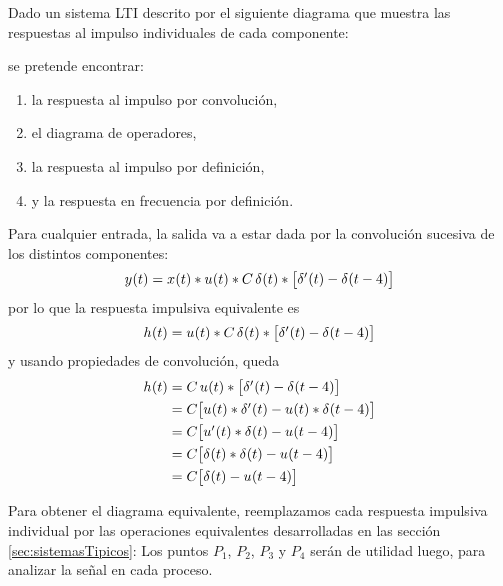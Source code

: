 \begin{mdframed}[style=ExampleFrame]
    \begin{example}
    \end{example}
    Dado un sistema LTI descrito por el siguiente diagrama que muestra las respuestas al impulso individuales de cada componente:

    \begin{center}
        \def\svgwidth{\linewidth}
        
    \end{center}

    se pretende encontrar:

    \begin{enumerate}
        \item la respuesta al impulso por convolución,
        \item el diagrama de operadores,
        \item la respuesta al impulso por definición,
        \item y la respuesta en frecuencia por definición.
    \end{enumerate}


    Para cualquier entrada, la salida va a estar dada por la convolución sucesiva de los distintos componentes:
    \[
        \fx[y]{t} = \fx[x]{t} * \fx[u]{t} * C \, \fx[\delta]{t} * \inBrackets{\fx[\delta']{t} - \fx[\delta]{t-4}}
    \]
    por lo que la respuesta impulsiva equivalente es
    \[
        \fx[h]{t} = \fx[u]{t} * C \, \fx[\delta]{t} * \inBrackets{\fx[\delta']{t} - \fx[\delta]{t-4}}
    \]
    y usando propiedades de convolución, queda
    \begin{align*}
        \fx[h]{t}
        & = C \, \fx[u]{t} * \inBrackets{\fx[\delta']{t} - \fx[\delta]{t-4}}
        \\
        & = C \inBrackets{\fx[u]{t} * \fx[\delta']{t} - \fx[u]{t} * \fx[\delta]{t-4}}
        \\
        & = C \inBrackets{\fx[u']{t} * \fx[\delta]{t} - \fx[u]{t-4}}
        \\
        & = C \inBrackets{\fx[\delta]{t} * \fx[\delta]{t} - \fx[u]{t-4}}
        \\
        & = C \inBrackets{\fx[\delta]{t} - \fx[u]{t-4}}
    \end{align*}


    Para obtener el diagrama equivalente, reemplazamos cada respuesta impulsiva individual por las operaciones equivalentes desarrolladas en las sección \ref{sec:sistemasTipicos}:
    Los puntos $P_1$, $P_2$, $P_3$ y $P_4$ serán de utilidad luego, para analizar la señal en cada proceso.


\end{mdframed}
